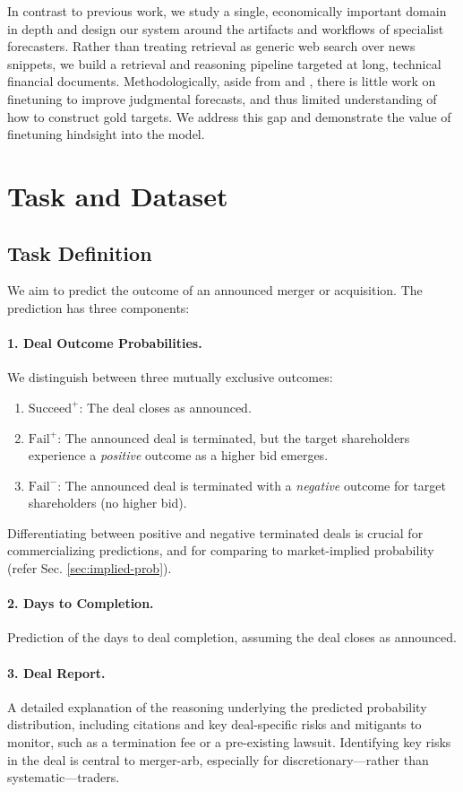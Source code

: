 \documentclass{article}
\theoremstyle{plain}
\theoremstyle{definition}
\theoremstyle{remark}
\newcommand{\SucceedPlus}{\boldsymbol{\mathrm{Succeed}^{+}}}
\newcommand{\FailPlus}{\boldsymbol{\mathrm{Fail}^{+}}}
\newcommand{\FailMinus}{\boldsymbol{\mathrm{Fail}^{-}}}
\begin{document}
In contrast to previous work, we study a single, economically important domain in depth and design our system around the artifacts and workflows of specialist forecasters. Rather than treating retrieval as generic web search over news snippets, we build a retrieval and reasoning pipeline targeted at long, technical financial documents. Methodologically, aside from \citet{halawi2024approaching} and \citet{turtel2025outcome}, there is little work on finetuning to improve judgmental forecasts, and thus limited understanding of how to construct gold targets. We address this gap and demonstrate the value of finetuning hindsight into the model.


\section{Task and Dataset}


\subsection{Task Definition}

We aim to predict the outcome of an announced merger or acquisition. The prediction has three components:

\paragraph{1. Deal Outcome Probabilities.} We distinguish between three mutually exclusive outcomes:
\begin{enumerate}
    \item $\SucceedPlus$: The deal closes as announced.
    \item $\FailPlus$: The announced deal is terminated, but the target shareholders experience a \emph{positive} outcome as a higher bid emerges.
    \item $\FailMinus$: The announced deal is terminated with a \emph{negative} outcome for target shareholders (no higher bid).
\end{enumerate}
Differentiating between positive and negative terminated deals is crucial for commercializing predictions, and for comparing to market-implied probability (refer Sec. \ref{sec:implied-prob}).
\paragraph{2. Days to Completion.} Prediction of the days to deal completion, assuming the deal closes as announced.
\paragraph{3. Deal Report.} A detailed explanation of the reasoning underlying the predicted probability distribution, including citations and key deal-specific risks and mitigants to monitor, such as a termination fee or a pre-existing lawsuit. Identifying key risks in the deal is central to merger-arb, especially for discretionary---rather than systematic---traders. 
\end{document}
